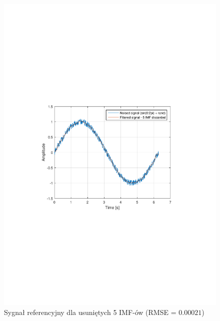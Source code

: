 \begin{figure}[!htb]
    \begin{center}
        \includegraphics[width=13cm,trim=3cm 9.2cm 4cm 10cm,clip]
        {../img/sin_rmse5.pdf}
    \end{center}
    \caption{Sygnał referencyjny dla usuniętych 5 IMF-ów (RMSE = $0.00021$)}
    \label{rys:sin_rmse5}
\end{figure}
